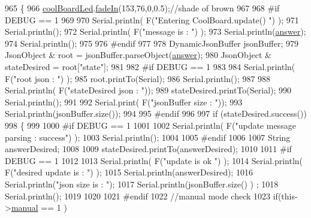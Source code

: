 \begin{DoxyCode}
965 \{
966     \hyperlink{class_cool_board_a1b1d3c684a5baa56b08486e192fd8e97}{coolBoardLed}.\hyperlink{class_cool_board_led_ab778f5e7bed0ab74e3906d82110493c3}{fadeIn}(153,76,0,0.5);\textcolor{comment}{//shade of brown        }
967 
968 \textcolor{preprocessor}{#if DEBUG == 1}
969 
970     Serial.println( F(\textcolor{stringliteral}{"Entering CoolBoard.update() "}) );
971     Serial.println();
972     Serial.println( F(\textcolor{stringliteral}{"message is : "}) );
973     Serial.println(\hyperlink{class_cool_board_a7b835fafd449e5282f7f91d787a2dc15}{answer});
974     Serial.println();
975 
976 \textcolor{preprocessor}{#endif}
977 
978     DynamicJsonBuffer jsonBuffer;
979     JsonObject & root = jsonBuffer.parseObject(\hyperlink{class_cool_board_a7b835fafd449e5282f7f91d787a2dc15}{answer});
980     JsonObject & stateDesired = root[\textcolor{stringliteral}{"state"}];
981 
982 \textcolor{preprocessor}{#if DEBUG == 1}
983 
984     Serial.println( F(\textcolor{stringliteral}{"root json : "}) );
985     root.printTo(Serial);
986     Serial.println();
987 
988     Serial.println( F(\textcolor{stringliteral}{"stateDesired json : "}));
989     stateDesired.printTo(Serial);
990     Serial.println();
991     
992     Serial.print( F(\textcolor{stringliteral}{"jsonBuffer size : "}));
993     Serial.println(jsonBuffer.size());
994 
995 \textcolor{preprocessor}{#endif}
996 
997     \textcolor{keywordflow}{if} (stateDesired.success())
998     \{
999     
1000 \textcolor{preprocessor}{    #if DEBUG == 1}
1001 
1002         Serial.println( F(\textcolor{stringliteral}{"update message parsing : success"}) );
1003         Serial.println();
1004     
1005 \textcolor{preprocessor}{    #endif}
1006 
1007             String answerDesired;
1008         
1009             stateDesired.printTo(answerDesired);
1010             
1011 \textcolor{preprocessor}{        #if DEBUG == 1      }
1012         
1013             Serial.println( F(\textcolor{stringliteral}{"update is ok "}) );
1014             Serial.println( F(\textcolor{stringliteral}{"desired update is : "}) );            
1015             Serial.println(answerDesired);
1016             Serial.println(\textcolor{stringliteral}{"json size is : "});
1017             Serial.println(jsonBuffer.size() ) ;                
1018             Serial.println();
1019 
1020         
1021 \textcolor{preprocessor}{        #endif}
1022             \textcolor{comment}{//manual mode check}
1023             \textcolor{keywordflow}{if}(this->\hyperlink{class_cool_board_a7c8e505a5804b109e112d5a03df6ea2b}{manual} == 1 )

\end{DoxyCode}
